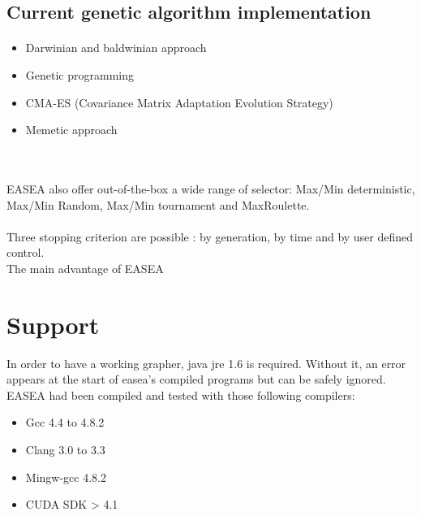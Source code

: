 \documentclass{book}
\begin{document}
    \subsection{Current genetic algorithm implementation} %
    \label{sub:current genetic algorithm implementation}
    \paragraph{} %
    \label{par:}
    \begin{itemize}
      \item Darwinian and baldwinian approach
      \item Genetic programming
      \item CMA-ES (Covariance Matrix Adaptation Evolution Strategy)
      \item Memetic approach 
    \end{itemize}
\\
    \paragraph{} %
    \label{par:}
    
    EASEA also offer out-of-the-box a wide range of selector: Max/Min deterministic,
    Max/Min Random, Max/Min tournament and MaxRoulette.
    \paragraph{} %
    \label{par:}
    
    Three stopping criterion are possible : by generation, by time and by user
    defined control.
\\
    The main advantage of EASEA 


\section{Support} %
\label{sec:Support}
In order to have a working grapher, java jre 1.6 is required. Without it, an error appears at the start of easea's compiled programs but can be safely ignored.
\\
EASEA had been compiled and tested with those following compilers:

    \begin{itemize}
      \item Gcc 4.4 to 4.8.2
      \item Clang 3.0 to 3.3
      \item Mingw-gcc 4.8.2
      \item CUDA SDK > 4.1
    \end{itemize}
\end{document}
